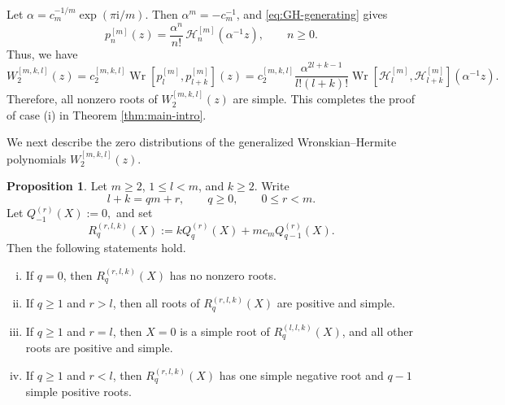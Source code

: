 \documentclass[preprint,3p,10pt]{elsarticle}
\renewcommand{\i}{\mathrm{i}}
\DeclareMathOperator{\Wr}{Wr}
\theoremstyle{definition}
\newtheorem{proposition}[definition]{Proposition}
\begin{document}
Let \(\alpha=c_m^{-1/m}\exp(\pi\i/m)\).  Then \(\alpha^m=-c_m^{-1}\), and
\eqref{eq:GH-generating} gives
\begin{equation}
    p_n^{[m]}(z)
    =
    \frac{\alpha^n}{n!}\,
    \mathcal H_n^{[m]}(\alpha^{-1}z),
    \qquad n\ge0.
\end{equation}
Thus, we have 
\begin{equation}
    W_2^{[m,k,l]}(z)  = c_2^{[m,k,l]} \Wr\left[p_l^{[m]},p_{l+k}^{[m]}\right](z)
    =
    c_2^{[m,k,l]}\frac{\alpha^{2l+k-1}}{l!(l+k)!}
    \Wr\left[\mathcal H_l^{[m]},\mathcal H_{l+k}^{[m]}\right](\alpha^{-1}z).
\end{equation}  
Therefore, all nonzero roots of $W_2^{[m,k,l]}(z)$ are simple. This completes the proof of case (i) in Theorem \ref{thm:main-intro}.



We next describe the zero distributions of the generalized Wronskian--Hermite polynomials
\(W_2^{[m,k,l]}(z)\).

\begin{proposition}
\label{prop:GH-Wr-sign-distribution}
Let \(m\geq2\), \(1\leq l<m\), and \(k\geq2\). Write
\begin{equation}
    l+k=qm+r,
    \qquad q\geq0,
    \qquad 0\leq r<m.
\end{equation}
Let $Q_{-1}^{(r)}(X):=0,$
and set
\begin{equation}
    R_q^{(r,l,k)}(X)
    :=
    kQ_q^{(r)}(X)+mc_mQ_{q-1}^{(r)}(X).
\end{equation}
Then the following statements hold.

\begin{enumerate}[(i)]
\item If \(q=0\), then \(R_q^{(r,l,k)}(X)\) has no nonzero roots.

\item If \(q\geq1\) and \(r>l\), then all roots of
\(R_q^{(r,l,k)}(X)\) are positive and simple.

\item If \(q\geq1\) and \(r=l\), then \(X=0\) is a simple root of
\(R_q^{(l,l,k)}(X)\), and all other roots are positive and simple.

\item If \(q\geq1\) and \(r<l\), then \(R_q^{(r,l,k)}(X)\) has one simple negative root and \(q-1\) simple positive roots. 
\end{enumerate}
\end{proposition}
\end{document}
